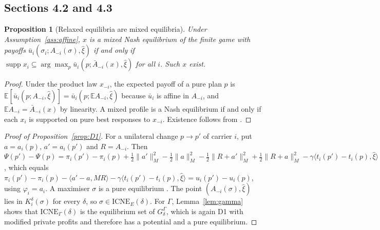 \documentclass[preprint,12pt]{elsarticle}
\newtheorem{proposition}[theorem]{Proposition}
\theoremstyle{definition}
\theoremstyle{remark}
\newcommand{\E}{\mathbb{E}}
\newcommand{\ub}{\bar u}
\newcommand{\Abar}{\bar A}
\newcommand{\supp}{\operatorname{supp}}
\newcommand{\ICNE}{\mathrm{ICNE}}
\newcommand{\ip}[2]{\langle #1,#2\rangle}
\begin{document}
\subsection{Sections 4.2 and 4.3}

\begin{proposition}[Relaxed equilibria are mixed equilibria]\label{prop:relaxed}
Under Assumption~\ref{ass:affine}, $x$ is a mixed Nash equilibrium of the finite game with payoffs $\ub_i(\sigma_i;A_{-i}(\sigma),\hat\xi)$ if and only if $\supp x_i\subseteq\arg\max_p\ub_i(p;\Abar_{-i}(x),\hat\xi)$ for all $i$. Such $x$ exist.
\end{proposition}
\begin{proof}
Under the product law $x_{-i}$, the expected payoff of a pure plan $p$ is $\E[\ub_i(p;A_{-i},\hat\xi)]=\ub_i(p;\E A_{-i},\hat\xi)$ because $\ub_i$ is affine in $A_{-i}$, and $\E A_{-i}=\Abar_{-i}(x)$ by linearity. A mixed profile is a Nash equilibrium if and only if each $x_i$ is supported on pure best responses to $x_{-i}$. Existence follows from \citet{Nash1951}.
\end{proof}

\begin{proof}[Proof of Proposition~\ref{prop:D1}]
For a unilateral change $p\to p'$ of carrier $i$, put $a=a_i(p)$, $a'=a_i(p')$ and $R=A_{-i}$. Then $\Psi(p')-\Psi(p)=\pi_i(p')-\pi_i(p)+\tfrac12\|a'\|_M^2-\tfrac12\|a\|^2_M-\tfrac12\|R+a'\|_M^2+\tfrac12\|R+a\|_M^2-\gamma\ip{t_i(p')-t_i(p)}{\hat\xi}$, which equals $\pi_i(p')-\pi_i(p)-\ip{a'-a}{MR}-\gamma\ip{t_i(p')-t_i(p)}{\hat\xi}=u_i(p')-u_i(p)$, using $\varphi_i=a_i$. A maximiser $\sigma$ is a pure equilibrium \citep{Monderer1996}. The point $(A_{-i}(\sigma),\hat\xi)$ lies in $K_i^\delta(\sigma)$ for every $\delta$, so $\sigma\in\ICNE_E(\delta)$. For $\Gamma$, Lemma~\ref{lem:gamma} shows that $\ICNE_\Gamma(\delta)$ is the equilibrium set of $G^\Gamma_\delta$, which is again D1 with modified private profits and therefore has a potential and a pure equilibrium.
\end{proof}
\end{document}
